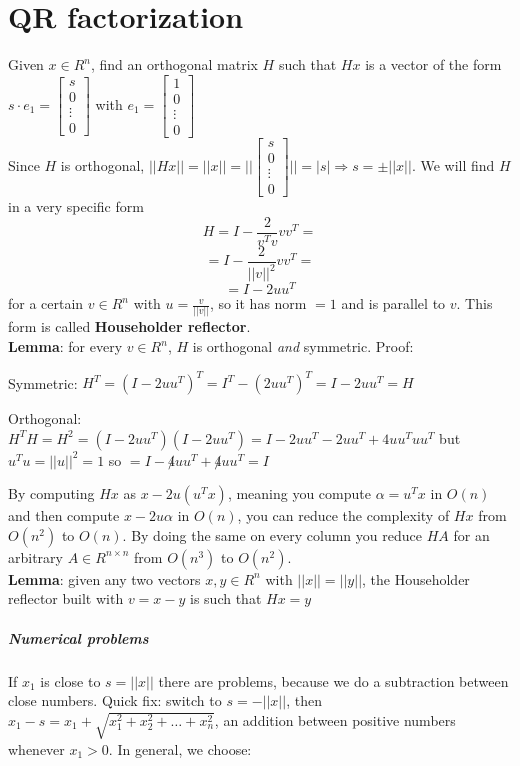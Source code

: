 \documentclass[10pt]{report}
\begin{document}
\section{QR factorization} Given $x\in R^n$, find an orthogonal matrix $H$ such that $Hx$ is a vector of the form $s\cdot e_1 = \left[\begin{array}{c}
s\\0\\\vdots\\0
\end{array}\right]$ with $e_1 = \left[\begin{array}{c}
1\\0\\\vdots\\0
\end{array}\right]$\\
Since $H$ is orthogonal, $||Hx|| = ||x|| = ||\left[\begin{array}{c}
s\\0\\\vdots\\0
\end{array}\right]|| = |s| \Rightarrow s = \pm||x||$. We will find $H$ in a very specific form $$H = I - \frac{2}{v^Tv}vv^T=$$ $$= I - \frac{2}{||v||^2}vv^T =$$ $$= I - 2uu^T$$ for a certain $v\in R^n$ with $u = \frac{v}{||v||}$, so it has norm $=1$ and is parallel to $v$. This form is called \textbf{Householder reflector}.\\
\textbf{Lemma}: for every $v\in R^n$, $H$ is orthogonal \textit{and} symmetric. Proof:
\begin{list}{}{}
	\item Symmetric: $H^T = (I-2uu^T)^T = I^T - (2uu^T)^T = I - 2uu^T = H$
	\item Orthogonal: $H^TH = H^2 = (I-2uu^T)(I-2uu^T) = I - 2uu^T - 2uu^T + 4uu^Tuu^T$ but $u^Tu = ||u||^2 = 1$ so $= I - \not 4uu^T + \not 4uu^T = I$
\end{list}
By computing $Hx$ as $x - 2u(u^T x)$, meaning you compute $\alpha = u^Tx$ in $O(n)$ and then compute $x-2u\alpha$ in $O(n)$, you can reduce the complexity of $Hx$ from $O(n^2)$ to $O(n)$. By doing the same on every column you reduce $HA$ for an arbitrary $A\in R^{n\times n}$ from $O(n^3)$ to $O(n^2)$.\\
\textbf{Lemma}: given any two vectors $x,y\in R^n$ with $||x|| = ||y||$, the Householder reflector built with $v = x-y$ is such that $Hx = y$
\subparagraph{Numerical problems} If $x_1$ is close to $s = ||x||$ there are problems, because we do a subtraction between close numbers. Quick fix: switch to $s = -||x||$, then $x_1 - s = x_1 + \sqrt{x_1^2+x_2^2+\ldots+x_n^2}$, an addition between positive numbers whenever $x_1 > 0$. In general, we choose:
\end{document}
